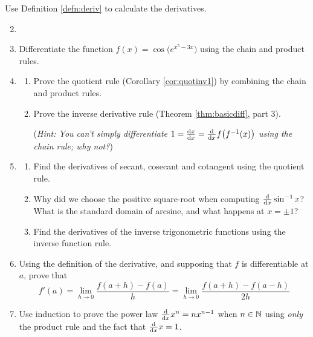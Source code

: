 \begin{exercises}{}
	\exstart Use Definition \ref{defn:deriv} to calculate the derivatives.
	\begin{enumerate}\setcounter{enumi}{1}
		\item[]
	  
	  
	  \item Differentiate the function $f(x)=\cos\bigl(e^{x^5-3x}\bigr)$ using the chain and product rules.
	  
	  
	  \item\begin{enumerate}
	    \item Prove the quotient rule (Corollary \ref{cor:quotinv1}) by combining the chain and product rules.
	  	\item Prove the inverse derivative rule (Theorem \ref{thm:basicdiff}, part 3).\par
	  	(\emph{Hint: You can't simply differentiate $1=\diff[x]x=\diff xf\bigl(f^{-1}(x)\bigr)$ using the chain rule; why not?})
	  \end{enumerate}
	  
	  
	  \item\begin{enumerate}
	    \item Find the derivatives of secant, cosecant and cotangent using the quotient rule.
	    \item Why did we choose the positive square-root when computing $\diff x\sin^{-1}x$? What is the standard domain of arcsine, and what happens at $x=\pm 1$?
	    \item Find the derivatives of the inverse trigonometric functions using the inverse function rule.
	  \end{enumerate}
	  
	  
	  \item\label{ex:hderiv} Using the definition of the derivative, and supposing that $f$ is differentiable at $a$, prove that
	  \[
	  	f'(a)=\lim_{h\to 0}\frac{f(a+h)-f(a)}{h}=\lim_{h\to 0}\frac{f(a+h)-f(a-h)}{2h}
	  \]
	  
	  
   	\item Use induction to prove the power law $\diff xx^n=nx^{n-1}$ when $n\in\N$ using \emph{only} the product rule and the fact that $\diff xx=1$.
   		  

\end{enumerate}
\end{exercises}
